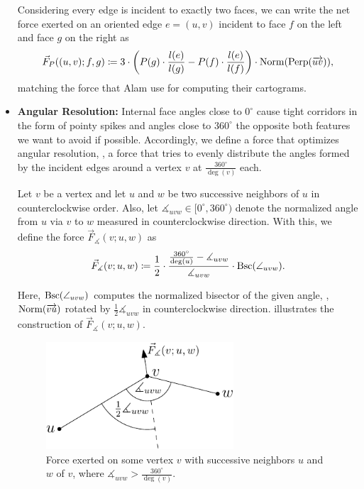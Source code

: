 \begin{itemize}
Considering every edge is incident to exactly two faces, we can write the net force exerted on an oriented edge $e = (u,v)$ incident to face $f$ on the left and face $g$ on the right as
%
\begin{equation*}
	\vec{F}_P((u,v);f,g) \coloneqq
	3 \cdot \left( P(g)\cdot\frac{l(e)}{l(g)} - P(f)\cdot\frac{l(e)}{l(f)} \right)
	\cdot \operatorname{Norm}(\operatorname{Perp}(\overrightarrow{uv}))
	,
\end{equation*}
%
matching the force that Alam \etal{} \cite{alam2013computing} use for computing their cartograms.


\item \textbf{Angular Resolution:} %
Internal face angles close to $0^\circ$ cause tight corridors in the form of pointy spikes and angles close to $360^\circ$ the opposite \emdash{} both features we want to avoid if possible.
Accordingly, we define a force that optimizes angular resolution, \ie{}, a force that tries to evenly distribute the angles formed by the incident edges around a vertex $v$ at $\frac{360^\circ}{\deg(v)}$ each.

Let $v$ be a vertex and let $u$ and $w$ be two successive neighbors of $u$ in counterclockwise order.
Also, let $\measuredangle_{uvw} \in \lbrack 0^\circ, 360^\circ )$ denote the normalized angle from $u$ via $v$ to $w$ measured in counterclockwise direction.
With this, we define the force $\vec{F}_\measuredangle(v;u,w)$ as
%
\begin{equation}
	\vec{F}_\measuredangle(v;u,w) \coloneqq
	\frac{1}{2} \cdot \frac{\frac{360^\circ}{\deg(u)} - \measuredangle_{uvw}}{\measuredangle_{uvw}}
	\cdot \operatorname{Bsc}(\angle_{uvw})
	.
\end{equation}

Here, $\operatorname{Bsc}(\angle_{uvw})$ computes the normalized bisector of the given angle, \ie{}, $\operatorname{Norm}(\overrightarrow{vu})$ rotated by $\frac{1}{2} \measuredangle_{uvw}$ in counterclockwise direction.
 illustrates the construction of $\vec{F}_\measuredangle(v;u,w)$.

\begin{figure}[H]
	\centering
	\includegraphics[height=40mm]{Resources/Drawing-Forces-AngularResolution.pdf}
	\caption{Force exerted on some vertex $v$ with successive neighbors $u$ and $w$ of $v$, where $\measuredangle_{uvw} > \frac{360^\circ}{\deg(v)}$.}
	\label{fig:drawing-forces-angular-resolution}
\end{figure}


\end{itemize}
